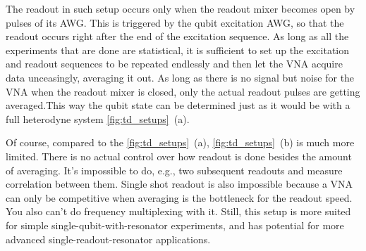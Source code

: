 The readout in such setup occurs only when the readout mixer becomes open by pulses of its AWG. This is triggered by the qubit excitation AWG, so that the readout occurs right after the end of the excitation sequence. As long as all the experiments that are done are statistical, it is sufficient to set up the excitation and readout sequences to be repeated endlessly and then let the VNA acquire data unceasingly, averaging it out. As long as there is no signal but noise for the VNA when the readout mixer is closed, only the actual readout pulses are getting averaged.This way the qubit state can be determined just as it would be with a full heterodyne system \autoref{fig:td_setups}~(a).

Of course, compared to the \autoref{fig:td_setups}~(a),  \autoref{fig:td_setups}~(b) is much more limited. There is no actual control over how readout is done besides the amount of averaging. It's impossible to do, e.g., two subsequent readouts and measure correlation between them. Single shot readout is also impossible because a VNA can only be competitive when averaging is the bottleneck for the readout speed. You also can't do frequency multiplexing with it. Still, this setup is more suited for simple single-qubit-with-resonator experiments, and has potential for more advanced single-readout-resonator applications.